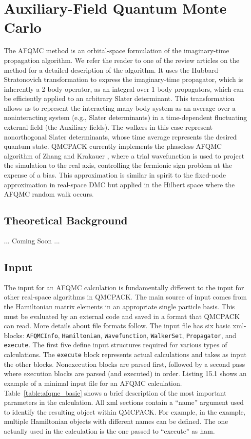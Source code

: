 \chapter{Auxiliary-Field Quantum Monte Carlo}\label{chap:afqmc}
The AFQMC method is an orbital-space formulation of the imaginary-time propagation algorithm. We refer the reader to one of the review articles on the method \cite{AFQMC_review,PhysRevLett.90.136401,PhysRevE.70.056702} for a detailed description of the algorithm. It uses the Hubbard-Stratonovich transformation to express the imaginary-time propagator, which is inherently a 2-body operator, as an integral over 1-body propagators, which can be efficiently applied to an arbitrary Slater determinant. This transformation allows us to represent the interacting many-body system as an average over a noninteracting system (e.g., Slater determinants) in a time-dependent fluctuating external field (the Auxiliary fields). The walkers in this case represent nonorthogonal Slater determinants, whose time average represents the desired quantum state. QMCPACK currently implements the phaseless AFQMC algorithm of Zhang and Krakauer \cite{PhysRevLett.90.136401}, where a trial wavefunction is used to project the simulation to the real axis, controlling the fermionic sign problem at the expense of a bias. This approximation is similar in spirit to the fixed-node approximation in real-space DMC but applied in the Hilbert space where the AFQMC random walk occurs.     

\section{Theoretical Background}
... Coming Soon ...

\section{Input}

The input for an AFQMC calculation is fundamentally different to the input for other real-space algorithms in QMCPACK. The main source of input comes from the Hamiltonian matrix elements in an appropriate single particle basis. This must be evaluated by an external code and saved in a format that QMCPACK can read. More details about file formats follow. The input file has six basic xml-blocks: \texttt{AFQMCInfo}, \texttt{Hamiltonian}, \texttt{Wavefunction}, \texttt{WalkerSet}, \texttt{Propagator}, and \texttt{execute}. The first five define input structures required for various types of calculations. The \texttt{execute} block represents actual calculations and takes as input the other blocks. 
Nonexecution blocks are parsed first, followed by a second pass where execution blocks are parsed (and executed) in order. Listing 15.1 shows an example of a minimal input file for an AFQMC calculation. Table~\ref{table:afqmc_basic} shows a brief description of the most important parameters in the calculation. All xml sections contain a ``name'' argument used to identify the resulting object within QMCPACK. For example, in the example, multiple Hamiltonian objects with different names can be defined. The one actually used in the calculation is the one passed to ``execute'' as ham.

